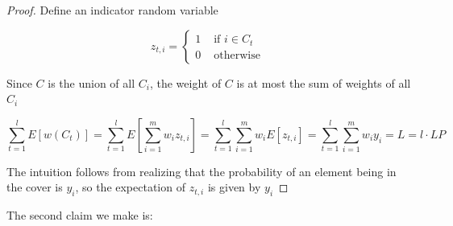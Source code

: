 \documentclass[../notes.tex]{subfiles}
\begin{document}
\begin{proof}
    Define an indicator random variable

    \begin{equation}
        z_{t, i} = \begin{cases}
            1 & \text{ if } i \in C_t \\
            0 & \text{ otherwise }
        \end{cases}
    \end{equation}

    Since $ C $ is the union of all $ C_i $, the weight of $ C $ is at most the sum of weights of all $ C_i $

    \begin{equation}
        \sum^l_{t=1} E[w(C_t)] = \sum^l_{t=1} E[\sum_{i = 1}^m w_i z_{t,i}] = \sum^l_{t=1} \sum_{i = 1}^m w_i E[z_{t,i}] = \sum^l_{t=1} \sum_{i=1}^m w_i y_i = L = l \cdot  LP
    \end{equation}

    The intuition follows from realizing that the probability of an element being in the cover is $ y_i $, so the expectation of $ z_{t,i} $ is given by $ y_i $


\end{proof}

The second claim we make is:
\end{document}
